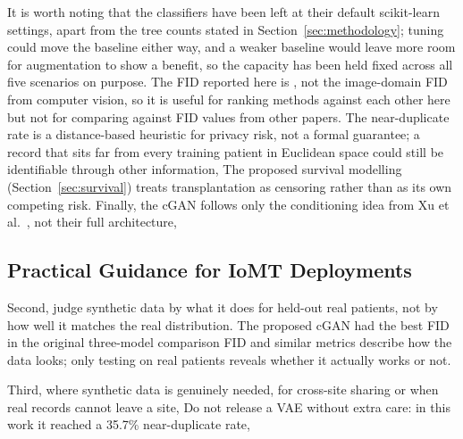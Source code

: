 It is worth noting that the classifiers have been left at their default scikit-learn settings, apart from the tree counts stated in Section~\ref{sec:methodology}; tuning could move the baseline either way, and a weaker baseline would leave more room for augmentation to show a benefit, so the capacity has been held fixed across all five scenarios on purpose. The FID reported here is , not the image-domain FID from computer vision, so it is useful for ranking methods against each other here but not for comparing against FID values from other papers. The near-duplicate rate is a distance-based heuristic for privacy risk, not a formal guarantee; a record that sits far from every training patient in Euclidean space could still be identifiable through other information,  The proposed survival modelling (Section~\ref{sec:survival}) treats transplantation as censoring rather than as its own competing risk.  Finally, the cGAN follows only the conditioning idea from Xu et al.\ \cite{xu2019}, not their full architecture, 

\subsection{Practical Guidance for IoMT Deployments}


Second, judge synthetic data by what it does for held-out real patients, not by how well it matches the real distribution. The proposed cGAN had the best FID in the original three-model comparison  FID and similar metrics describe how the data looks; only testing on real patients reveals whether it actually works or not.

Third, where synthetic data is genuinely needed, for cross-site sharing or when real records cannot leave a site,  Do not release a VAE without extra care: in this work it reached a 35.7\% near-duplicate rate, 

